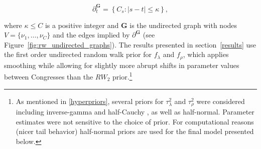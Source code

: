 \begin{equation*}
\partial^\mathbf{G}_t = \left\{C_s : \left| s - t \right| \leq \kappa \right\},
\end{equation*}

\noindent where $\kappa \leq C$ is a positive integer and $\mathbf{G}$ is the undirected graph 
with nodes $V = \{\nu_1, \dots, \nu_C\}$ and the edges implied by $\partial^\mathbf{G}$ 
(see Figure~\ref{fig:rw_undirected_graphs}). The results presented in section~\ref{results} use 
the first order undirected random walk prior for $f_\lambda$ and $f_\rho$, which applies smoothing 
while allowing for slightly more abrupt shifts in parameter values between Congresses than the 
$RW_2$ prior.\footnote{As mentioned in \ref{hyperpriors}, several priors for $\tau^2_\lambda$ 
and $\tau^2_\rho$ were considered including inverse-gamma  
and half-Cauchy , as well as half-normal. Parameter estimates were 
not sensitive to the choice of prior. For computational reasons (nicer tail behavior) half-normal priors 
are used for the final model presented below.}
 


